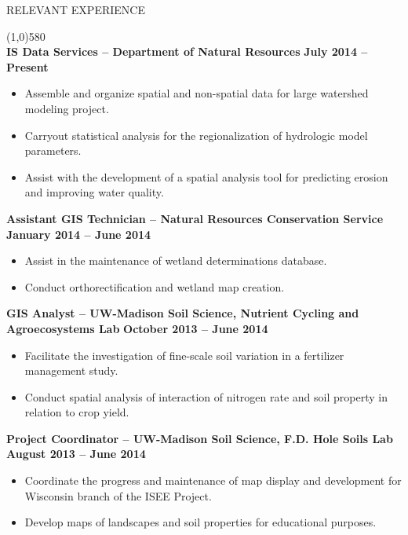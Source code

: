 \documentclass{article}
\begin{document}
\noindent \large{RELEVANT EXPERIENCE}\\ \begin{small}
\line(1,0){580}\\
\noindent \textbf{IS Data Services -- Department of Natural Resources} \hfill \textbf{July 2014 -- Present}
\begin{itemize}
\item Assemble and organize spatial and non-spatial data for large watershed modeling project.
\item Carryout statistical analysis for the regionalization of hydrologic model parameters. 
\item Assist with the development of a spatial analysis tool 
 for predicting erosion and improving water quality.
\end{itemize}
\noindent \textbf{Assistant GIS Technician -- Natural Resources Conservation Service} \hfill \textbf{January 2014 -- June 2014}
\begin{itemize}
\item Assist in the maintenance of wetland determinations database.
\item Conduct orthorectification and wetland map creation. 
\end{itemize}
\noindent \textbf{GIS Analyst -- UW-Madison Soil Science, Nutrient Cycling and Agroecosystems Lab} \hfill \textbf{October 2013 -- June 2014}
\begin{itemize}
\item Facilitate the investigation of fine-scale soil variation in a fertilizer management study.
\item Conduct spatial analysis of interaction of nitrogen rate and soil property in relation to crop yield.
\end{itemize}
\noindent \textbf{Project Coordinator -- UW-Madison Soil Science, F.D. Hole Soils Lab} \hfill \textbf{August 2013 -- June 2014}
\begin{itemize}
\item Coordinate the progress and maintenance of map display and development for Wisconsin branch of the ISEE Project.
\item Develop maps of landscapes and soil properties for educational purposes.

\end{itemize}
\end{small}
\end{document}
